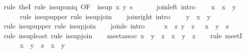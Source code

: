 \begin{isabellebody}
\ {\isacharparenleft}rule\ theI{\isacharparenright}\ {\isacharparenleft}rule\ is{\isacharunderscore}sup{\isacharunderscore}uniq\ {\isacharbrackleft}OF\ {\isacharunderscore}\ {\isacharbackquoteopen}is{\isacharunderscore}sup\ x\ y\ s{\isacharbackquoteclose}{\isacharbrackright}{\isacharparenright}\isanewline
\ \ \isamarkupfalse%
\isanewline
\isanewline
\ \ \isamarkupfalse%
\ join{\isacharunderscore}left\ {\isacharbrackleft}intro{\isacharquery}{\isacharbrackright}{\isacharcolon}\isanewline
\ \ \ \ {\isachardoublequoteopen}x\ {\isasymsqsubseteq}\ x\ {\isasymsqunion}\ y{\isachardoublequoteclose}\isanewline
\ \ \ \ \isamarkupfalse%
\ {\isacharparenleft}rule\ is{\isacharunderscore}sup{\isacharunderscore}upper{\isacharparenright}\ {\isacharparenleft}rule\ is{\isacharunderscore}sup{\isacharunderscore}join{\isacharparenright}\isanewline
\isanewline
\ \ \isamarkupfalse%
\ join{\isacharunderscore}right\ {\isacharbrackleft}intro{\isacharquery}{\isacharbrackright}{\isacharcolon}\isanewline
\ \ \ \ {\isachardoublequoteopen}y\ {\isasymsqsubseteq}\ x\ {\isasymsqunion}\ y{\isachardoublequoteclose}\isanewline
\ \ \ \ \isamarkupfalse%
\ {\isacharparenleft}rule\ is{\isacharunderscore}sup{\isacharunderscore}upper{\isacharparenright}\ {\isacharparenleft}rule\ is{\isacharunderscore}sup{\isacharunderscore}join{\isacharparenright}\isanewline
\isanewline
\ \ \isamarkupfalse%
\ join{\isacharunderscore}le\ {\isacharbrackleft}intro{\isacharquery}{\isacharbrackright}{\isacharcolon}\isanewline
\ \ \ \ {\isachardoublequoteopen}{\isasymlbrakk}\ x\ {\isasymsqsubseteq}\ z{\isacharsemicolon}\ y\ {\isasymsqsubseteq}\ z\ {\isasymrbrakk}\ {\isasymLongrightarrow}\ x\ {\isasymsqunion}\ y\ {\isasymsqsubseteq}\ z{\isachardoublequoteclose}\isanewline
\ \ \ \ \isamarkupfalse%
\ {\isacharparenleft}rule\ is{\isacharunderscore}sup{\isacharunderscore}least{\isacharparenright}\ {\isacharparenleft}rule\ is{\isacharunderscore}sup{\isacharunderscore}join{\isacharparenright}\isanewline
\isanewline
\ \ \isamarkupfalse%
\ meet{\isacharunderscore}assoc{\isacharcolon}\ {\isachardoublequoteopen}{\isacharparenleft}x\ {\isasymsqinter}\ y{\isacharparenright}\ {\isasymsqinter}\ z\ {\isacharequal}\ x\ {\isasymsqinter}\ {\isacharparenleft}y\ {\isasymsqinter}\ z{\isacharparenright}{\isachardoublequoteclose}\isanewline
\ \ \isamarkupfalse%
\ {\isacharparenleft}rule\ meetI{\isacharparenright}\isanewline
\ \ \ \ \isamarkupfalse%
\ {\isachardoublequoteopen}x\ {\isasymsqinter}\ {\isacharparenleft}y\ {\isasymsqinter}\ z{\isacharparenright}\ {\isasymsqsubseteq}\ x\ {\isasymsqinter}\ y{\isachardoublequoteclose}\isanewline

\end{isabellebody}
